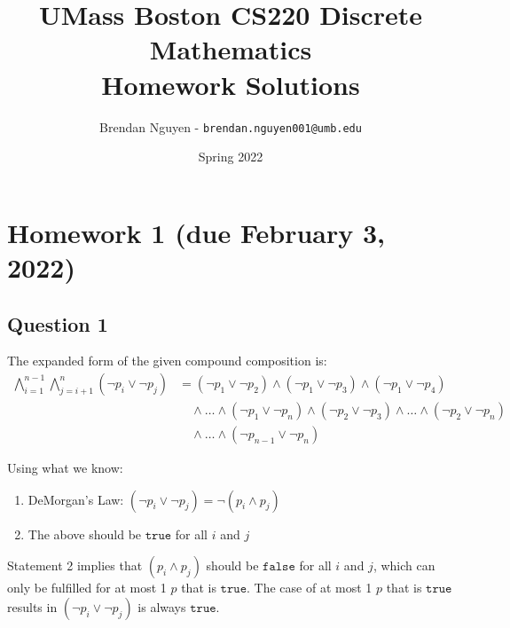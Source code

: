 \documentclass[letterpaper, 12pt]{article}
\title{UMass Boston CS220 Discrete Mathematics\\Homework Solutions}
\author{Brendan Nguyen - \texttt{brendan.nguyen001@umb.edu}}
\date{Spring 2022}
\begin{document}
\maketitle

\tableofcontents

\newpage

\section*{Homework 1 (due February 3, 2022)}

\subsection*{Question 1}
The expanded form of the given compound composition is:
\[
    \begin{split}
        \bigwedge_{i=1}^{n-1} \bigwedge_{j=i+1}^n (\neg p_i \lor \neg p_j) &= (\neg p_1 \lor \neg p_2) \land (\neg p_1 \lor \neg p_3) \land (\neg p_1 \lor \neg p_4)\\
        &\quad\land \ldots \land (\neg p_1 \lor \neg p_n) \land (\neg p_2 \lor \neg p_3) \land \ldots \land (\neg p_2 \lor \neg p_n)\\
        &\quad\land \ldots \land (\neg p_{n-1} \lor \neg p_n)
    \end{split}
\]
	
Using what we know:

\begin{enumerate}[label=\arabic*.]
  \item DeMorgan's Law: $(\neg p_i \lor \neg p_j) = \neg (p_i \land p_j)$
  \item The above should be $\texttt{true}$ for all $i$ and $j$
\end{enumerate}

Statement 2 implies that $(p_i \land p_j)$ should be $\texttt{false}$ for all $i$ and $j$, which can only be fulfilled for at most 1 $p$ that is $\texttt{true}$. The case of at most 1 $p$ that is $\texttt{true}$ results in $(\neg p_i \lor \neg p_j)$ is always $\texttt{true}$.
\end{document}
